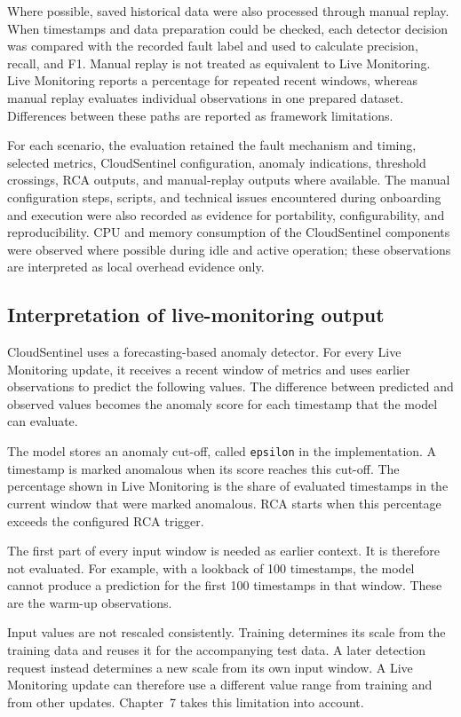 Where possible, saved historical data were also processed through manual replay. When timestamps and data preparation could be checked, each detector decision was compared with the recorded fault label and used to calculate precision, recall, and F1. Manual replay is not treated as equivalent to Live Monitoring. Live Monitoring reports a percentage for repeated recent windows, whereas manual replay evaluates individual observations in one prepared dataset. Differences between these paths are reported as framework limitations.

For each scenario, the evaluation retained the fault mechanism and timing, selected metrics, CloudSentinel configuration, anomaly indications, threshold crossings, RCA outputs, and manual-replay outputs where available. The manual configuration steps, scripts, and technical issues encountered during onboarding and execution were also recorded as evidence for portability, configurability, and reproducibility. CPU and memory consumption of the CloudSentinel components were observed where possible during idle and active operation; these observations are interpreted as local overhead evidence only.

\subsection{Interpretation of live-monitoring output}
CloudSentinel uses a forecasting-based anomaly detector. For every Live Monitoring update, it receives a recent window of metrics and uses earlier observations to predict the following values. The difference between predicted and observed values becomes the anomaly score for each timestamp that the model can evaluate.

The model stores an anomaly cut-off, called \texttt{epsilon} in the implementation. A timestamp is marked anomalous when its score reaches this cut-off. The percentage shown in Live Monitoring is the share of evaluated timestamps in the current window that were marked anomalous. RCA starts when this percentage exceeds the configured RCA trigger.

The first part of every input window is needed as earlier context. It is therefore not evaluated. For example, with a lookback of 100 timestamps, the model cannot produce a prediction for the first 100 timestamps in that window. These are the warm-up observations.

Input values are not rescaled consistently. Training determines its scale from the training data and reuses it for the accompanying test data. A later detection request instead determines a new scale from its own input window. A Live Monitoring update can therefore use a different value range from training and from other updates. Chapter~7 takes this limitation into account.

